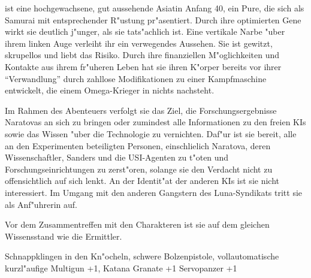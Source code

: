 \xl{} ist eine hochgewachsene, gut aussehende Asiatin Anfang 40, ein Pure, die sich als Samurai mit entsprechender R"ustung pr"asentiert. Durch ihre optimierten Gene wirkt sie deutlich j"unger, als sie tats"achlich ist. Eine vertikale Narbe "uber ihrem linken Auge verleiht ihr ein verwegendes Aussehen. Sie ist gewitzt, skrupellos und liebt das Risiko. Durch ihre finanziellen M"oglichkeiten und Kontakte aus ihrem fr"uheren Leben hat sie ihren K"orper bereits vor ihrer ``Verwandlung'' durch zahllose Modifikationen zu einer Kampfmaschine entwickelt, die einem Omega-Krieger in nichts nachsteht.

Im Rahmen des Abenteuers verfolgt sie das Ziel, die Forschungsergebnisse Naratovas an sich zu bringen oder zumindest alle Informationen zu den freien KIs sowie das Wissen "uber die Technologie zu vernichten. Daf"ur ist sie bereit, alle an den Experimenten beteiligten Personen, einschlie\3lich Naratova, deren Wissenschaftler, Sanders und die USI-Agenten zu t"oten und Forschungseinrichtungen zu zerst"oren, solange sie den Verdacht nicht zu offensichtlich auf sich lenkt. An der Identit"at der anderen KIs ist sie nicht interessiert. Im Umgang mit den anderen Gangstern des Luna-Syndikats tritt sie als Anf"uhrerin auf.

Vor dem Zusammentreffen mit den Charakteren ist sie auf dem gleichen Wissensstand wie die Ermittler.

\begin{nscsheet}[f]{\xls}
    \nscstats[ATT=3,AGG=3,DEX=2,COM=2,CON=2]
    \nscruler
    \begin{nscinventory}
        \nscitem[Waffen] Schnappklingen in den Kn"ocheln, schwere Bolzenpistole, vollautomatische kurzl"aufige Multigun +1, Katana
        \nscitem[Granaten] Granate +1
        \nscitem[R"ustung] Servopanzer +1
    \end{nscinventory}
\end{nscsheet}
